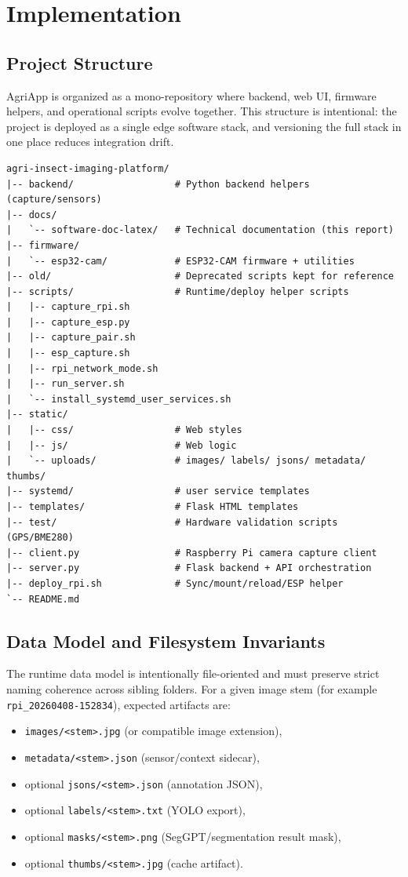 \section{Implementation}

\subsection{Project Structure}
AgriApp is organized as a mono-repository where backend, web UI, firmware helpers, and operational scripts evolve together. This structure is intentional: the project is deployed as a single edge software stack, and versioning the full stack in one place reduces integration drift.

\begin{verbatim}
agri-insect-imaging-platform/
|-- backend/                  # Python backend helpers (capture/sensors)
|-- docs/
|   `-- software-doc-latex/   # Technical documentation (this report)
|-- firmware/
|   `-- esp32-cam/            # ESP32-CAM firmware + utilities
|-- old/                      # Deprecated scripts kept for reference
|-- scripts/                  # Runtime/deploy helper scripts
|   |-- capture_rpi.sh
|   |-- capture_esp.py
|   |-- capture_pair.sh
|   |-- esp_capture.sh
|   |-- rpi_network_mode.sh
|   |-- run_server.sh
|   `-- install_systemd_user_services.sh
|-- static/
|   |-- css/                  # Web styles
|   |-- js/                   # Web logic
|   `-- uploads/              # images/ labels/ jsons/ metadata/ thumbs/
|-- systemd/                  # user service templates
|-- templates/                # Flask HTML templates
|-- test/                     # Hardware validation scripts (GPS/BME280)
|-- client.py                 # Raspberry Pi camera capture client
|-- server.py                 # Flask backend + API orchestration
|-- deploy_rpi.sh             # Sync/mount/reload/ESP helper
`-- README.md
\end{verbatim}

\subsection{Data Model and Filesystem Invariants}
The runtime data model is intentionally file-oriented and must preserve strict naming coherence across sibling folders. For a given image stem (for example \texttt{rpi\_20260408-152834}), expected artifacts are:
\begin{itemize}
  \item \texttt{images/<stem>.jpg} (or compatible image extension),
  \item \texttt{metadata/<stem>.json} (sensor/context sidecar),
  \item optional \texttt{jsons/<stem>.json} (annotation JSON),
  \item optional \texttt{labels/<stem>.txt} (YOLO export),
  \item optional \texttt{masks/<stem>.png} (SegGPT/segmentation result mask),
  \item optional \texttt{thumbs/<stem>.jpg} (cache artifact).
\end{itemize}


